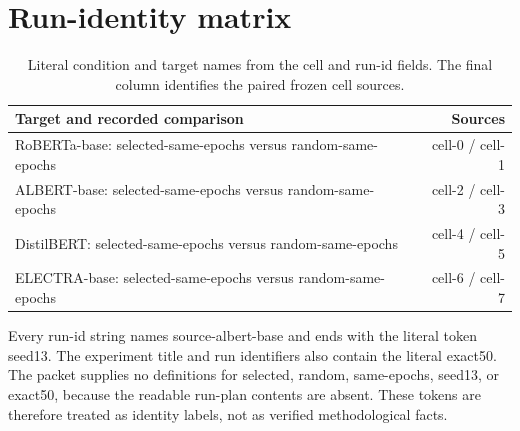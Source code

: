 \documentclass[10pt,twocolumn,letterpaper]{article}
\begin{document}
\section{Run-identity matrix}\label{run-matrix}
\begin{table}[H]\centering\normalsize
\caption{Literal condition and target names from the cell and run-id fields. The final column identifies the paired frozen cell sources.}
\begin{tabularx}{\textwidth}{@{}Xr@{}}
\toprule
Target and recorded comparison & Sources \\ \midrule
RoBERTa-base: selected-same-epochs versus random-same-epochs & cell-0 / cell-1 \\
ALBERT-base: selected-same-epochs versus random-same-epochs & cell-2 / cell-3 \\
DistilBERT: selected-same-epochs versus random-same-epochs & cell-4 / cell-5 \\
ELECTRA-base: selected-same-epochs versus random-same-epochs & cell-6 / cell-7 \\
\bottomrule\end{tabularx}\end{table}
Every run-id string names source-albert-base and ends with the literal token seed13. The experiment title and run identifiers also contain the literal exact50. The packet supplies no definitions for selected, random, same-epochs, seed13, or exact50, because the readable run-plan contents are absent. These tokens are therefore treated as identity labels, not as verified methodological facts.
\end{document}
